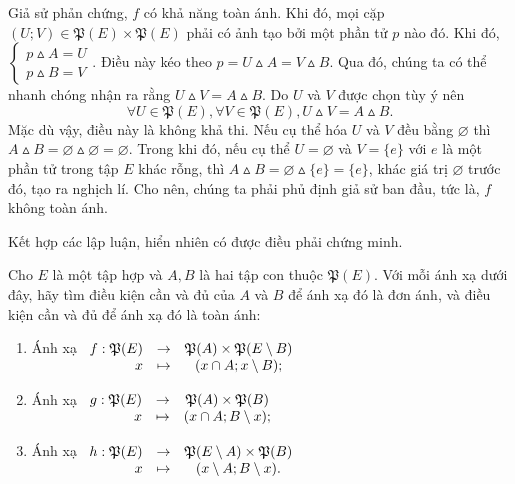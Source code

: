 Giả sử phản chứng, $f$ có khả năng toàn ánh. Khi đó, mọi cặp $(U; V) \in \mathfrak{P}(E) \times \mathfrak{P}(E)$ phải có ảnh tạo bởi một phần tử $p$ nào đó. Khi đó, $\begin{cases}
   p \vartriangle A = U \\
   p \vartriangle B = V 
\end{cases}$. Điều này kéo theo $p = U \vartriangle A = V \vartriangle B$. Qua đó, chúng ta có thể nhanh chóng nhận ra rằng $U \vartriangle V = A \vartriangle B$. Do $U$ và $V$ được chọn tùy ý nên \begin{equation*}
   \forall U \in \mathfrak{P}(E), \forall V \in \mathfrak{P}(E), U \vartriangle V = A \vartriangle B.
\end{equation*}
Mặc dù vậy, điều này là không khả thi. Nếu cụ thể hóa $U$ và $V$ đều bằng $\varnothing$ thì $A \vartriangle B = \varnothing \vartriangle \varnothing = \varnothing$. Trong khi đó, nếu cụ thể $U = \varnothing$ và $V = \{e\}$ với $e$ là một phần tử trong tập $E$ khác rỗng, thì $A \vartriangle B = \varnothing \vartriangle \{e\} = \{e\}$, khác giá trị $\varnothing$ trước đó, tạo ra nghịch lí. Cho nên, chúng ta phải phủ định giả sử ban đầu, tức là, $f$ không toàn ánh.

Kết hợp các lập luận, hiển nhiên có được điều phải chứng minh.

\exercise Cho $E$ là một tập hợp và $A, B$ là hai tập con thuộc $\mathfrak{P}(E)$. Với mỗi ánh xạ dưới đây, hãy tìm điều kiện cần và đủ của $A$ và $B$ để ánh xạ đó là đơn ánh, và điều kiện cần và đủ để ánh xạ đó là toàn ánh:
\begin{enumerate}
   \item Ánh xạ $\begin{array}[t]{rcc}
      f : \mathfrak{P}(E) &\to &\mathfrak{P}(A) \times \mathfrak{P}(E \setminus B) \\
      x &\mapsto &(x \cap A; x \setminus B);
   \end{array}$

   \item Ánh xạ $\begin{array}[t]{rcc}
      g : \mathfrak{P}(E) &\to &\mathfrak{P}(A) \times \mathfrak{P}(B) \\
      x &\mapsto &(x \cap A; B \setminus x);
   \end{array}$

   \item Ánh xạ $\begin{array}[t]{rcc}
      h : \mathfrak{P}(E) &\to &\mathfrak{P}(E \setminus A) \times \mathfrak{P}(B) \\
      x &\mapsto &(x \setminus A; B \setminus x).
   \end{array}$
\end{enumerate}

